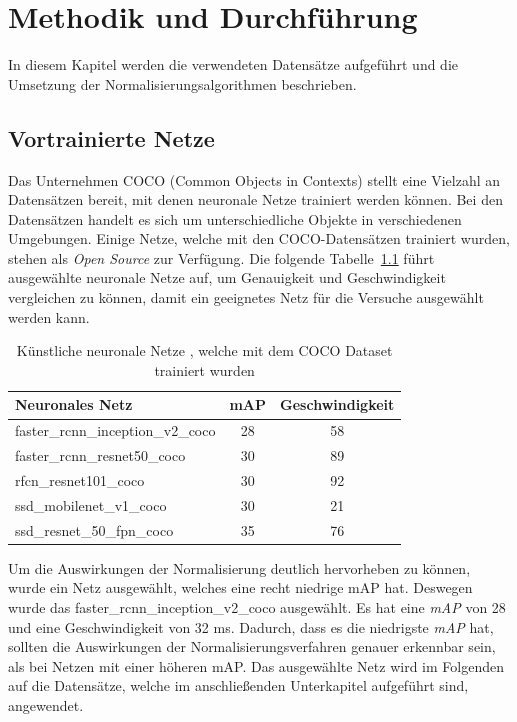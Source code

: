 \chapter{Methodik und Durchführung}\label{s.methudurchf}
In diesem Kapitel werden die verwendeten Datensätze aufgeführt und die Umsetzung der Normalisierungsalgorithmen beschrieben.  
 \section{Vortrainierte Netze}\label{s.modell}
Das Unternehmen COCO \cite{common2018data} (Common Objects in Contexts) stellt eine Vielzahl an Datensätzen bereit, mit denen neuronale Netze trainiert werden können. Bei den Datensätzen handelt es sich um unterschiedliche Objekte in verschiedenen Umgebungen.  
Einige Netze, welche mit den COCO-Datensätzen trainiert wurden, stehen als \textit{Open Source} zur Verfügung. Die folgende Tabelle~\ref{tab:cocomodels} führt ausgewählte neuronale Netze auf, um Genauigkeit und Geschwindigkeit vergleichen zu können, damit ein geeignetes Netz für die Versuche ausgewählt werden kann.
\begin{table}
[h]
\caption{Künstliche neuronale Netze \cite{google2018tens}, welche mit dem COCO Dataset trainiert wurden \cite{common2018data}} 
\label{tab:cocomodels}
\centering
\begin{tabular}{|l|c|c|}
\hline
Neuronales Netz & mAP & Geschwindigkeit\\
\hline
faster\_rcnn\_inception\_v2\_coco & 28 & 58\\
faster\_rcnn\_resnet50\_coco & 30 & 89\\
rfcn\_resnet101\_coco & 30 & 92\\
ssd\_mobilenet\_v1\_coco & 30 & 21\\
ssd\_resnet\_50\_fpn\_coco & 35 & 76\\
\hline
\end{tabular}
\end{table}
Um die Auswirkungen der Normalisierung deutlich hervorheben zu können, wurde ein Netz ausgewählt, welches eine recht niedrige mAP hat. Deswegen wurde das faster\_rcnn\_inception\_v2\_coco ausgewählt. Es hat eine \textit{mAP} von 28 und eine Geschwindigkeit von 32 ms. Dadurch, dass es die niedrigste \textit{mAP} hat, sollten die Auswirkungen der Normalisierungsverfahren genauer erkennbar sein, als bei Netzen mit einer höheren mAP. Das ausgewählte Netz wird im Folgenden auf die Datensätze, welche im anschließenden Unterkapitel aufgeführt sind, angewendet.
